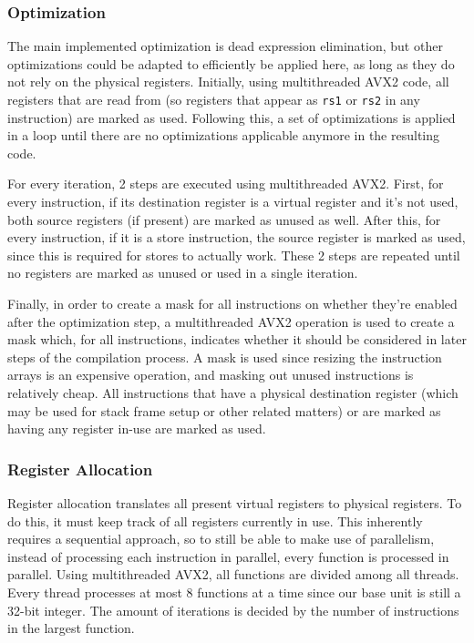 \documentclass[12pt,dvipsnames]{article}
\newcommand{\mono}[1]{\texttt{#1}}
\begin{document}
\subsubsection{Optimization}
The main implemented optimization is dead expression elimination, but other optimizations could be adapted to efficiently be applied here, as long as they do not rely on the physical registers. Initially, using multithreaded AVX2 code, all registers that are read from (so registers that appear as \mono{rs1} or \mono{rs2} in any instruction) are marked as used. Following this, a set of optimizations is applied in a loop until there are no optimizations applicable anymore in the resulting code.

For every iteration, 2 steps are executed using multithreaded AVX2. First, for every instruction, if its destination register is a virtual register and it's not used, both source registers (if present) are marked as unused as well. After this, for every instruction, if it is a store instruction, the source register is marked as used, since this is required for stores to actually work. These 2 steps are repeated until no registers are marked as unused or used in a single iteration.

Finally, in order to create a mask for all instructions on whether they're enabled after the optimization step, a multithreaded AVX2 operation is used to create a mask which, for all instructions, indicates whether it should be considered in later steps of the compilation process. A mask is used since resizing the instruction arrays is an expensive operation, and masking out unused instructions is relatively cheap. All instructions that have a physical destination register (which may be used for stack frame setup or other related matters) or are marked as having any register in-use are marked as used.

\subsubsection{Register Allocation}
Register allocation translates all present virtual registers to physical registers. To do this, it must keep track of all registers currently in use. This inherently requires a sequential approach, so to still be able to make use of parallelism, instead of processing each instruction in parallel, every function is processed in parallel. Using multithreaded AVX2, all functions are divided among all threads. Every thread processes at most 8 functions at a time since our base unit is still a 32-bit integer. The amount of iterations is decided by the number of instructions in the largest function.
\end{document}
